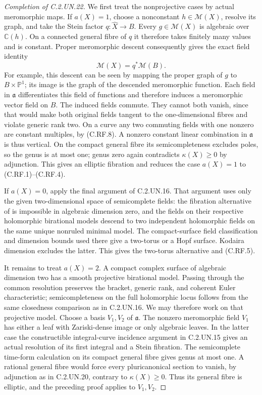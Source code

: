 \begin{proof}[Completion of C.2.UN.22]
We first treat the nonprojective cases by actual
meromorphic maps. If $a(X)=1$, choose a nonconstant
$h\in\mathcal M(X)$, resolve its graph, and take the
Stein factor $q:\widehat X\to B$. Every
$g\in\mathcal M(X)$ is algebraic over $\mathbb C(h)$.
On a connected general fibre of $q$ it therefore takes
finitely many values and is constant. Proper meromorphic
descent consequently gives the exact field identity
\[
                       \mathcal M(X)=q^*\mathcal M(B).
                                                               \tag{C.RF.9}
\]
For example, this descent can be seen by mapping the
proper graph of $g$ to $B\times\mathbb P^1$; its image
is the graph of the descended meromorphic function.
Each field in $\mathfrak a$ differentiates this field
of functions and therefore induces a meromorphic vector
field on $B$. The induced fields commute. They cannot
both vanish, since that would make both original fields
tangent to the one-dimensional fibres and violate
generic rank two. On a curve any two commuting fields
with one nonzero are constant multiples, by (C.RF.8).
A nonzero constant linear combination in $\mathfrak a$
is thus vertical. On the compact general fibre its
semicompleteness excludes poles, so the genus is at most
one; genus zero again contradicts $\kappa(X)\ge0$ by
adjunction. This gives an elliptic fibration and reduces
the case $a(X)=1$ to (C.RF.1)--(C.RF.4).

If $a(X)=0$, apply the final argument of C.2.UN.16.
That argument uses only the given two-dimensional
space of semicomplete fields: the fibration alternative
of \cite[Theorem~9.2]{Guillot2024} is impossible in
algebraic dimension zero, and the fields on their
respective holomorphic birational models descend to
two independent holomorphic fields on the same unique
nonruled minimal model. The compact-surface field
classification and dimension bounds used there give
a two-torus or a Hopf surface. Kodaira dimension
excludes the latter. This gives the two-torus alternative
and (C.RF.5).

It remains to treat $a(X)=2$. A compact complex surface
of algebraic dimension two has a smooth projective
birational model. Passing through the common resolution
preserves the bracket, generic rank, and coherent Euler
characteristic; semicompleteness on the full holomorphic
locus follows from the same closedness comparison as in
C.2.UN.16. We may therefore work on that projective model.
Choose a basis $V_1,V_2$ of $\mathfrak a$. The nonzero
meromorphic field $V_1$ has either a leaf with Zariski-dense
image or only algebraic leaves. In the latter case the
constructible integral-curve incidence argument in
C.2.UN.15 gives an actual resolution of its first integral
and a Stein fibration. The semicomplete time-form calculation
on its compact general fibre gives genus at most one.
A rational general fibre would force every pluricanonical
section to vanish, by adjunction as in C.2.UN.20, contrary
to $\kappa(X)\ge0$. Thus its general fibre is elliptic,
and the preceding proof applies to $V_1,V_2$.


\end{proof}
